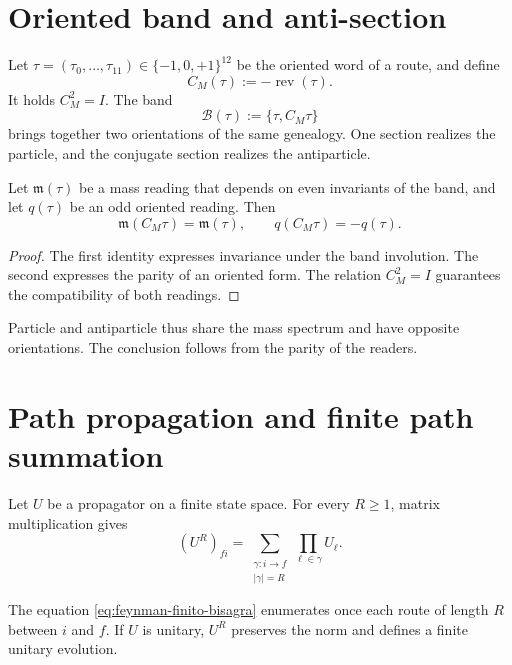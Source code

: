 \section{Oriented band and anti-section}

Let \(\tau=(\tau_0,\ldots,\tau_{11})\in\{-1,0,+1\}^{12}\) be the oriented word of a route, and define
\begin{equation}
 C_M(\tau):=-\operatorname{rev}(\tau).
 \label{eq:conjugacion-material-bisagra}
\end{equation}
It holds \(C_M^2=I\). The band
\[
 \mathcal B(\tau):=\{\tau,C_M\tau\}
\]
brings together two orientations of the same genealogy. One section realizes the
particle, and the conjugate section realizes the antiparticle.

\begin{proposition}
\label{prop:paridad-masa-orientacion-bisagra}
Let \(\mathfrak m(\tau)\) be a mass reading that depends on even invariants
of the band, and let \(q(\tau)\) be an odd oriented reading. Then
\[
 \mathfrak m(C_M\tau)=\mathfrak m(\tau),
 \qquad
 q(C_M\tau)=-q(\tau).
\]
\end{proposition}

\begin{proof}
The first identity expresses invariance under the band involution. The
second expresses the parity of an oriented form. The relation \(C_M^2=I\)
guarantees the compatibility of both readings.
\end{proof}

Particle and antiparticle thus share the mass spectrum and have
opposite orientations. The conclusion follows from the parity of the readers.

\section{Path propagation and finite path summation}

Let \(U\) be a propagator on a finite state space. For every
\(R\geq1\), matrix multiplication gives
\begin{equation}
 (U^R)_{fi}
 =\sum_{\substack{\gamma:i\to f\\|\gamma|=R}}
   \prod_{\ell\in\gamma}U_\ell.
 \label{eq:feynman-finito-bisagra}
\end{equation}

\begin{theorem}
\label{thm:feynman-finito-bisagra}
The equation \eqref{eq:feynman-finito-bisagra} enumerates once each route of
length \(R\) between \(i\) and \(f\). If \(U\) is unitary, \(U^R\) preserves
the norm and defines a finite unitary evolution.
\end{theorem}

